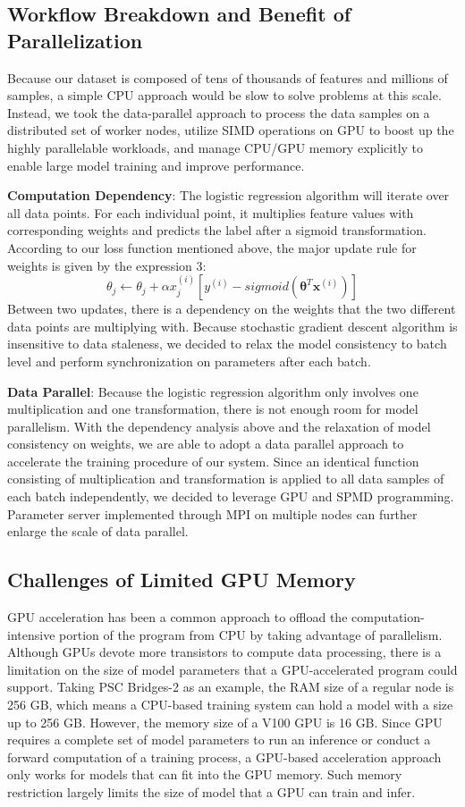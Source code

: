 \documentclass{article}
\newcommand{\xv}{\mathbf{x}}
\newcommand{\thetav     }{\boldsymbol \theta     }
\begin{document}
\subsection*{Workflow Breakdown and Benefit of Parallelization}

Because our dataset is composed of tens of thousands of features and millions of samples, a simple CPU approach would be slow to solve problems at this scale. Instead, we took the data-parallel approach to process the data samples on a distributed set of worker nodes, utilize SIMD operations on GPU to boost up the highly parallelable workloads, and manage CPU/GPU memory explicitly to enable large model training and improve performance.

\textbf{Computation Dependency}: The logistic regression algorithm will iterate over all data points. For each individual point, it multiplies feature values with corresponding weights and predicts the label after a sigmoid transformation. According to our loss function mentioned above, the major update rule for weights is given by the expression 3:
$$
    \theta_j \leftarrow \theta_j + \alpha x_j^{\left(i\right)} \left[y^{(i)}-sigmoid(\thetav^T\xv^{\left(i\right)})\right]
$$
Between two updates, there is a dependency on the weights that the two different data points are multiplying with. Because stochastic gradient descent algorithm is insensitive to data staleness, we decided to relax the model consistency to batch level and perform synchronization on parameters after each batch.


\textbf{Data Parallel}: Because the logistic regression algorithm only involves one multiplication and one transformation, there is not enough room for model parallelism. With the dependency analysis above and the relaxation of model consistency on weights, we are able to adopt a data parallel approach to accelerate the training procedure of our system. Since an identical function consisting of multiplication and transformation is applied to all data samples of each batch independently, we decided to leverage GPU and SPMD programming. Parameter server implemented through MPI on multiple nodes can further enlarge the scale of data parallel.


\subsection*{Challenges of Limited GPU Memory}
GPU acceleration has been a common approach to offload the computation-intensive portion of the program from CPU by taking advantage of parallelism. Although GPUs devote more transistors to compute data processing, there is a limitation on the size of model parameters that a GPU-accelerated program could support. Taking PSC Bridges-2 as an example, the RAM size of a regular node is 256 GB, which means a CPU-based training system can hold a model with a size up to 256 GB. However, the memory size of a V100 GPU is 16 GB. Since GPU requires a complete set of model parameters to run an inference or conduct a forward computation of a training process, a GPU-based acceleration approach only works for models that can fit into the GPU memory. Such memory restriction largely limits the size of model that a GPU can train and infer.
\end{document}
